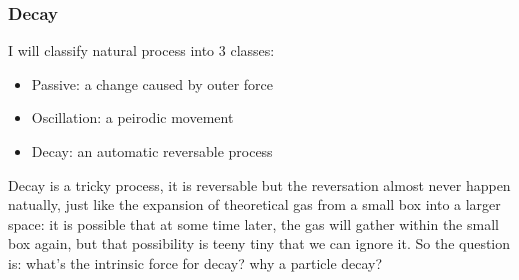 \subsubsection{Decay}
I will classify natural process into 3 classes:
\begin{itemize}
    \item Passive: a change caused by outer force
    \item Oscillation: a peirodic movement
    \item Decay: an automatic reversable process
\end{itemize}
Decay is a tricky process, it is reversable but the reversation almost never
happen natually, just like the expansion of theoretical gas from a small box
into a larger space: it is possible that at some time later, the gas will 
gather within the small box again, but that possibility is teeny tiny that 
we can ignore it. So the question is: what's the intrinsic force for decay?
why a particle decay?

